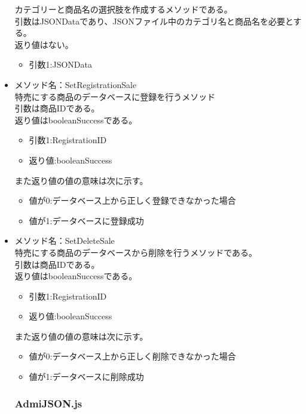 \documentclass[a4j]{jarticle}
\begin{document}
\begin{itemize}
カテゴリーと商品名の選択肢を作成するメソッドである。\\
引数はJSONDataであり、JSONファイル中のカテゴリ名と商品名を必要とする。\\
返り値はない。
	\begin{itemize}
		\item 引数1:JSONData
	\end{itemize}
	
\item メソッド名：SetRegistrationSale\\

特売にする商品のデータベースに登録を行うメソッド\\
引数は商品IDである。\\%
返り値はbooleanSuccessである。

	\begin{itemize}
		\item 引数1:RegistrationID
		\item 返り値:booleanSuccess
	\end{itemize}
また返り値の値の意味は次に示す。
	\begin{itemize}
		\item 値が0:データベース上から正しく登録できなかった場合
		\item 値が1:データベースに登録成功
	\end{itemize}
\item メソッド名：SetDeleteSale\\

特売にする商品のデータベースから削除を行うメソッドである。\\
引数は商品IDである。\\
返り値はbooleanSuccessである。

	\begin{itemize}
		\item 引数1:RegistrationID
		\item 返り値:booleanSuccess
	\end{itemize}
また返り値の値の意味は次に示す。
	\begin{itemize}
		\item 値が0:データベース上から正しく削除できなかった場合
		\item 値が1:データベースに削除成功
	\end{itemize}
	\subsubsection{AdmiJSON.js}
	

\end{itemize}
\end{document}
